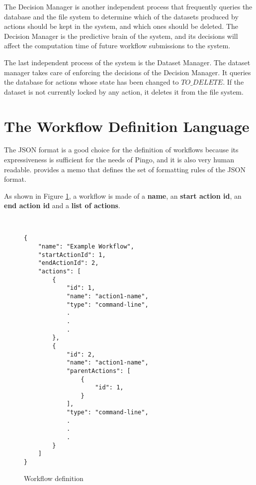 The Decision Manager is another independent process that frequently queries the database and the file system to determine which of the datasets produced by actions should be kept in the system, and which ones should be deleted. The Decision Manager is the predictive brain of the system, and its decisions will affect the computation time of future workflow submissions to the system.

The last independent process of the system is the Dataset Manager.  The dataset manager takes care of enforcing the decisions of the Decision Manager.  It queries the database for actions whose state has been changed to $TO\_DELETE$. If the dataset is not currently locked by any action, it deletes it from the file system.

\section{The Workflow Definition Language}
 The JSON format is a good choice for the definition of workflows because its expressiveness is sufficient for the needs of Pingo, and it is also very human readable. \cite{bray2014javascript} provides a memo that defines the set of formatting rules of the JSON format.
 
 As shown in Figure \ref{fig:workflow_definition_language}, a workflow is made of a \textbf{name}, an \textbf{start action id}, an \textbf{end action id} and a \textbf{list of actions}. 

\begin{figure}
\begin{mdframed}
\begin{singlespace}
\begin{verbatim}


{
    "name": "Example Workflow",
    "startActionId": 1,
    "endActionId": 2,
    "actions": [
        {
            "id": 1,
            "name": "action1-name",
            "type": "command-line",
            .
            .
            .
        },
        {
            "id": 2,
            "name": "action1-name",
            "parentActions": [
                { 
                    "id": 1,
                }
            ],
            "type": "command-line",
            .
            .
            .
        }
    ]
}
\end{verbatim}
\end{singlespace}
\end{mdframed}
\caption{Workflow definition}
\label{fig:workflow_definition_language}
\end{figure}

